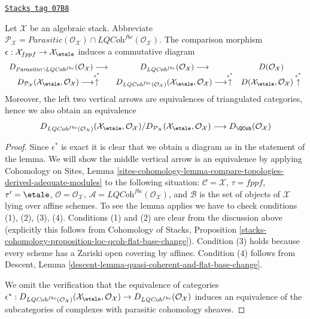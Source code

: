 \begin{lemma}
\label{stacks-perfect-lemma-compare-etale-fppf-QCoh}
\href{https://stacks.math.columbia.edu/tag/07B8}{\texttt{Stacks tag 07B8}}

Let $\mathcal{X}$ be an algebraic stack. Abbreviate
$\mathcal{P}_\mathcal{X} = \textit{Parasitic}(\mathcal{O}_\mathcal{X}) \cap
\textit{LQCoh}^{fbc}(\mathcal{O}_\mathcal{X})$.
The comparison morphism
$\epsilon : \mathcal{X}_{fppf} \to \mathcal{X}_\etale$
induces a commutative diagram
$$
\begin{array}{ccc}D_{\textit{Parasitic} \cap \textit{LQCoh}^{fbc}}(\mathcal{O}_\mathcal{X})
\longrightarrow & D_{\textit{LQCoh}^{fbc}}(\mathcal{O}_\mathcal{X}) \longrightarrow & D(\mathcal{O}_\mathcal{X}) \\ D_{\mathcal{P}_\mathcal{X}}(\mathcal{X}_\etale, \mathcal{O}_\mathcal{X})
\longrightarrow\overset{\epsilon^*}{\uparrow} & D_{\textit{LQCoh}^{fbc}(\mathcal{O}_\mathcal{X})}(
\mathcal{X}_\etale, \mathcal{O}_\mathcal{X})
\longrightarrow\overset{\epsilon^*}{\uparrow} & D(\mathcal{X}_\etale, \mathcal{O}_\mathcal{X})
\overset{\epsilon^*}{\uparrow}\end{array}
$$
Moreover, the left two vertical arrows are equivalences of triangulated
categories, hence we also obtain an equivalence
$$
D_{\textit{LQCoh}^{fbc}(\mathcal{O}_\mathcal{X})}
(\mathcal{X}_\etale, \mathcal{O}_\mathcal{X})
/
D_{\mathcal{P}_\mathcal{X}}(\mathcal{X}_\etale, \mathcal{O}_\mathcal{X})
\longrightarrow
D_\QCoh(\mathcal{O}_\mathcal{X})
$$
\end{lemma}

\begin{proof}
Since $\epsilon^*$ is exact it is clear that we obtain a diagram as
in the statement of the lemma. We will show the middle vertical
arrow is an equivalence by applying
Cohomology on Sites, Lemma
\ref{sites-cohomology-lemma-compare-topologies-derived-adequate-modules}
to the following situation:
$\mathcal{C} = \mathcal{X}$,
$\tau = fppf$,
$\tau' = \etale$,
$\mathcal{O} = \mathcal{O}_\mathcal{X}$,
$\mathcal{A} = \textit{LQCoh}^{fbc}(\mathcal{O}_\mathcal{X})$, and
$\mathcal{B}$ is the set of objects of $\mathcal{X}$ lying over
affine schemes. To see the lemma applies we have to check conditions
(1), (2), (3), (4). Conditions (1) and (2) are clear from the discussion
above (explicitly this follows from
Cohomology of Stacks,
Proposition \ref{stacks-cohomology-proposition-loc-qcoh-flat-base-change}).
Condition (3) holds because every scheme has a Zariski
open covering by affines. Condition (4) follows from
Descent, Lemma \ref{descent-lemma-quasi-coherent-and-flat-base-change}.

\medskip\noindent
We omit the verification that the equivalence of
categories $\epsilon^* :
D_{\textit{LQCoh}^{fbc}(\mathcal{O}_\mathcal{X})}(
\mathcal{X}_\etale, \mathcal{O}_\mathcal{X})
\to
D_{\textit{LQCoh}^{fbc}}(\mathcal{O}_\mathcal{X})$
induces an equivalence of the subcategories of complexes
with parasitic cohomology sheaves.
\end{proof}

